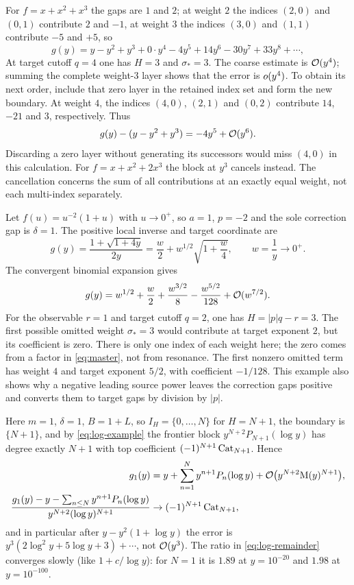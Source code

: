 \begin{example}[Resonances]
For $f=x+x^2+x^3$ the gaps are $1$ and $2$; at weight $2$ the indices $(2,0)$ and $(0,1)$ contribute $2$ and $-1$, at weight $3$ the indices $(3,0)$ and $(1,1)$ contribute $-5$ and $+5$, so
\[
 g(y)=y-y^2+y^3+0\cdot y^4-4y^5+14y^6-30y^7+33y^8+\cdots ,
\]
At target cutoff $q=4$ one has $H=3$ and $\sigma_*=3$.
The coarse estimate is $\mathcal O(y^4)$; summing the complete weight-$3$
layer shows that the error is $o(y^4)$. To obtain its next order,
include that zero layer in the retained index set and form the new boundary.
At weight $4$, the indices $(4,0)$, $(2,1)$ and $(0,2)$ contribute
$14$, $-21$ and $3$, respectively. Thus
\[
 g(y)-(y-y^2+y^3)=-4y^5+\mathcal O(y^6).
\]
Discarding a zero layer without generating its successors would miss
$(4,0)$ in this calculation. For $f=x+x^2+2x^3$ the block at $y^3$
cancels instead. The cancellation concerns the sum of all contributions
at an exactly equal weight, not each multi-index separately.
\end{example}

\begin{example}
Let $f(u)=u^{-2}(1+u)$ with $u\to0^+$, so $a=1$, $p=-2$ and
the sole correction gap is $\delta=1$. The positive local inverse and
target coordinate are
\[
 g(y)=\frac{1+\sqrt{1+4y}}{2y}
      =\frac w2+w^{1/2}\sqrt{1+\frac w4},\qquad w=\frac1y\to0^+.
\]
The convergent binomial expansion gives
\[
 g(y)=w^{1/2}+\frac w2+\frac{w^{3/2}}8
                   -\frac{w^{5/2}}{128}+\mathcal O(w^{7/2}).
\]
For the observable $r=1$ and target cutoff $q=2$, one has
$H=|p|q-r=3$. The first possible omitted weight $\sigma_*=3$
would contribute at target exponent $2$, but its coefficient is zero.
There is only one index of each weight here; the zero comes from a factor
in \eqref{eq:master}, not from resonance. The first nonzero omitted term
has weight $4$ and target exponent $5/2$, with coefficient $-1/128$.
This example also shows why a negative leading source power leaves the
correction gaps positive and converts them to target gaps by division by
$|p|$.
\end{example}

\begin{example}
Here $m=1$, $\delta=1$, $B=1+L$, so $I_H=\{0,\dots,N\}$ for $H=N+1$, the boundary is $\{N+1\}$, and by \eqref{eq:log-example} the frontier block $y^{N+2}P_{N+1}(\log y)$ has degree exactly $N+1$ with top coefficient $(-1)^{N+1}\operatorname{Cat}_{N+1}$. Hence
\begin{equation}
\begin{aligned}
 g_1(y)&=y+\sum_{n=1}^Ny^{n+1}P_n(\log y)+\mathcal O\bigl(y^{N+2}\mathrm M(y)^{N+1}\bigr),\\
 \frac{g_1(y)-y-\sum_{n\le N}y^{n+1}P_n(\log y)}{y^{N+2}(\log y)^{N+1}}&\to(-1)^{N+1}\operatorname{Cat}_{N+1},
\end{aligned}
 \label{eq:log-remainder}
\end{equation}
and in particular after $y-y^2(1+\log y)$ the error is $y^3(2\log^2y+5\log y+3)+\cdots$, not $\mathcal O(y^3)$. The ratio in \eqref{eq:log-remainder} converges slowly (like $1+c/\log y$): for $N=1$ it is $1.89$ at $y=10^{-20}$ and $1.98$ at $y=10^{-100}$.
\end{example}

